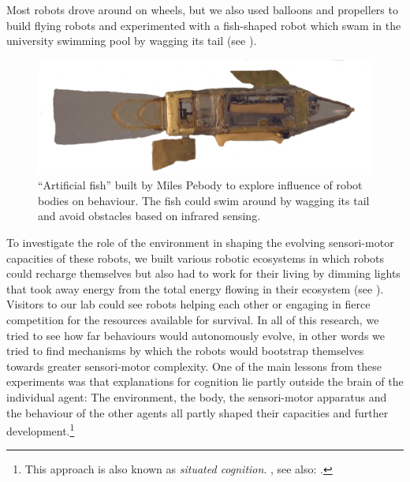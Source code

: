 Most robots drove around on wheels, but we also used balloons and propellers to build 
flying robots and experimented with a fish-shaped robot which swam in the university swimming pool by wagging 
its tail (see ). 


\begin{figure}[htbp]
  \centerline{\includegraphics[width=.85\textwidth]{chap1/figs/fish.pdf}}
\caption{``Artificial fish'' built by Miles Pebody to explore influence of robot bodies on behaviour. The fish could swim around by wagging 
its tail and avoid obstacles based on infrared sensing.}
\label{f:plate4}
\end{figure}

To investigate the role of the environment in shaping the
evolving sensori-motor capacities of these robots, 
we built various robotic 
ecosystems in which robots could recharge themselves but also
had to work for their living by 
dimming lights that took away energy from the total energy 
flowing in their ecosystem (see ). Visitors
to our lab could see robots helping each other or 
engaging in fierce competition for
the resources available for survival. In all of this
research, we tried to see how far behaviours would
autonomously evolve, in other words we tried to find 
mechanisms by which the robots would bootstrap themselves 
towards greater sensori-motor complexity. One of the 
main lessons from these experiments was that 
explanations for cognition lie partly outside the brain 
of the individual agent: The environment, the body, the 
sensori-motor apparatus and the behaviour of the other 
agents all partly shaped their capacities and 
further development.\footnote{This approach is also known as {\it situated cognition}. 
\cite{Clancey:1997}, see also: \cite{Varela:1991}.}


